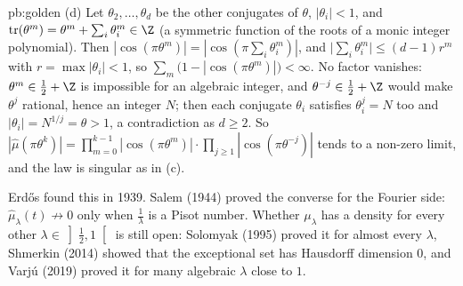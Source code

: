 \begin{solution}{pb:golden}
(d) Let $\theta_2,\dots,\theta_d$ be the other conjugates of $\theta$, $|\theta_i|<1$, and $\operatorname{tr}(\theta^m)=\theta^m+\sum_i\theta_i^m\in\Z$ (a symmetric function of the
roots of a monic integer polynomial). Then $|\cos(\pi\theta^m)|=|\cos(\pi\sum_i\theta_i^m)|$, and $\bigl|\sum_i\theta_i^m\bigr|\le(d-1)r^m$ with $r=\max|\theta_i|<1$, so
$\sum_m\bigl(1-|\cos(\pi\theta^m)|\bigr)<\infty$. No factor vanishes: $\theta^m\in\frac12+\Z$ is impossible for an algebraic integer, and $\theta^{-j}\in\frac12+\Z$ would make $\theta^j$
rational, hence an integer $N$; then each conjugate $\theta_i$ satisfies $\theta_i^j=N$ too and $|\theta_i|=N^{1/j}=\theta>1$, a contradiction as $d\ge2$. So
$|\hat\mu(\pi\theta^k)|=\prod_{m=0}^{k-1}|\cos(\pi\theta^m)|\cdot\prod_{j\ge1}|\cos(\pi\theta^{-j})|$ tends to a non-zero limit, and the law is singular as in (c).

\leads Erdős found this in 1939. Salem (1944) proved the converse for the Fourier side: $\hat\mu_\lambda(t)\not\to0$ only when $\frac1\lambda$ is a Pisot number. Whether
$\mu_\lambda$ has a density for every other $\lambda\in\left]\frac12,1\right[$ is still open: Solomyak (1995) proved it for almost every $\lambda$, Shmerkin (2014) showed that
the exceptional set has Hausdorff dimension $0$, and Varjú (2019) proved it for many algebraic $\lambda$ close to $1$.
\end{solution}

